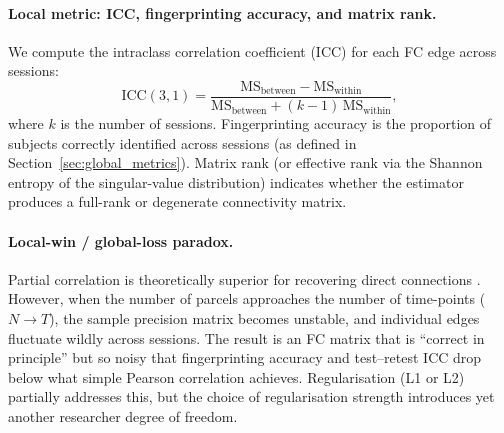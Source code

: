 \documentclass[11pt,a4paper]{article}
\begin{document}
\paragraph{Local metric: ICC, fingerprinting accuracy, and matrix rank.}
We compute the intraclass correlation coefficient (ICC) for each FC edge across sessions:
\begin{equation}
    \mathrm{ICC}(3,1) = \frac{\mathrm{MS}_{\mathrm{between}} - \mathrm{MS}_{\mathrm{within}}}{\mathrm{MS}_{\mathrm{between}} + (k-1)\,\mathrm{MS}_{\mathrm{within}}},
\end{equation}
where $k$ is the number of sessions.  Fingerprinting accuracy is the proportion of subjects correctly identified across sessions (as defined in Section~\ref{sec:global_metrics}).  Matrix rank (or effective rank via the Shannon entropy of the singular-value distribution) indicates whether the estimator produces a full-rank or degenerate connectivity matrix.

\paragraph{Local-win / global-loss paradox.}
Partial correlation is theoretically superior for recovering direct connections \citep{smith2011}.  However, when the number of parcels approaches the number of time-points ($N \to T$), the sample precision matrix becomes unstable, and individual edges fluctuate wildly across sessions.  The result is an FC matrix that is ``correct in principle'' but so noisy that fingerprinting accuracy and test--retest ICC drop below what simple Pearson correlation achieves.  Regularisation (L1 or L2) partially addresses this, but the choice of regularisation strength introduces yet another researcher degree of freedom.
\end{document}
